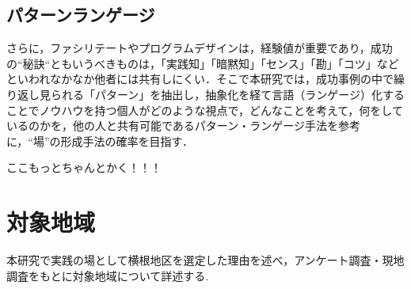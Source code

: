\documentclass[a4paper]{jsarticle}
\begin{document}
\subsection{パターンランゲージ}
さらに，ファシリテートやプログラムデザインは，経験値が重要であり，成功の“秘訣“ともいうべきものは，「実践知」「暗黙知」「センス」「勘」「コツ」などといわれなかなか他者には共有しにくい．そこで本研究では，成功事例の中で繰り返し見られる「パターン」を抽出し，抽象化を経て言語（ランゲージ）化することでノウハウを持つ個人がどのような視点で，どんなことを考えて，何をしているのかを，他の人と共有可能であるパターン・ランゲージ手法\cite{ptn}を参考に，“場”の形成手法の確率を目指す．\par

\par
\par
ここもっとちゃんとかく！！！
\par



\newpage
\section{対象地域}
本研究で実践の場として横根地区を選定した理由を述べ，アンケート調査・現地調査をもとに対象地域について詳述する.
\end{document}
